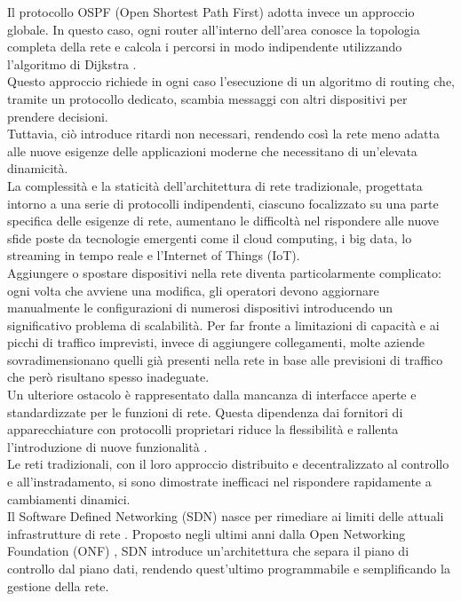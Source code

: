 Il protocollo OSPF (Open Shortest Path First) adotta invece un approccio globale.
In questo caso, ogni router all'interno dell'area conosce la topologia completa della rete e calcola i percorsi in modo indipendente utilizzando l'algoritmo di Dijkstra \cite{ospf}. 
\\Questo approccio richiede in ogni caso l'esecuzione di un algoritmo di routing che, tramite un protocollo dedicato, 
scambia messaggi con altri dispositivi per prendere decisioni.
\\Tuttavia, ciò introduce ritardi non necessari, rendendo così la rete meno adatta alle nuove esigenze delle applicazioni moderne che necessitano di un'elevata dinamicità.
\\La complessità e la staticità dell'architettura di rete tradizionale, progettata intorno a una serie di protocolli indipendenti, ciascuno focalizzato su una parte specifica delle esigenze di rete, 
aumentano le difficoltà nel rispondere alle nuove sfide poste da tecnologie emergenti come il cloud computing, i big data, lo streaming in tempo reale e l'Internet of Things (IoT).
\\Aggiungere o spostare dispositivi nella rete diventa particolarmente complicato: ogni volta che avviene una modifica, gli operatori devono aggiornare manualmente le configurazioni di numerosi dispositivi introducendo un significativo problema di scalabilità.
Per far fronte a limitazioni di capacità e ai picchi di traffico imprevisti, invece di aggiungere collegamenti, molte aziende sovradimensionano quelli già presenti nella rete in base alle previsioni di traffico che però risultano spesso inadeguate.
\\Un ulteriore ostacolo è rappresentato dalla mancanza di interfacce aperte e standardizzate per le funzioni di rete. %
Questa dipendenza dai fornitori di apparecchiature con protocolli proprietari riduce la flessibilità e rallenta l'introduzione di nuove funzionalità \cite{probtrad}.
\\Le reti tradizionali, con il loro approccio distribuito e decentralizzato al controllo e all'instradamento, si sono dimostrate inefficaci nel rispondere rapidamente a cambiamenti dinamici.
\\Il Software Defined Networking (SDN) nasce per rimediare ai limiti delle attuali infrastrutture di rete \cite{sdnsurvey}.
Proposto negli ultimi anni dalla Open Networking Foundation (ONF) \cite{ONF}, SDN introduce un'architettura che separa il piano di controllo dal piano dati, rendendo quest'ultimo programmabile e semplificando la gestione della rete. 
